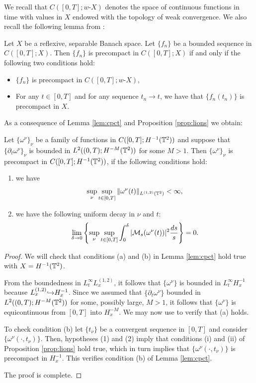 \documentclass[reqno,12pt]{amsart}
\begin{document}
We recall that $C([0,T];w\text{-}X)$ denotes the space of continuous functions in time with values in $X$ endowed with the topology of weak convergence. We also recall the following lemma from \cite{LNT}:

\begin{lemma}
\label{lem:cpct}
Let $X$ be a reflexive, separable Banach space. Let $\{f_n\}$ be a bounded sequence in $C([0,T];X)$. Then $\{f_n\}$ is precompact in $C([0,T];X)$ if and only if the following two conditions hold:
\begin{itemize}
\item[(a)] $\{f_n\}$ is precompact in $C([0,T];w\text{-}X)$,
\item[(b)] For any $t\in [0,T]$ and for any sequence $t_n \to t$, we have that $\{f_n(t_n)\}$ is precompact in $X$.
\end{itemize}
\end{lemma}




As a consequence of Lemma \ref{lem:cpct} and Proposition \ref{prop:lions} we obtain:
\begin{corollary}
\label{cor:cpct}
Let $\{\omega^\nu\}_\nu$ be a family of functions in $C([0,T];H^{-1}(\mathbb{T}^2))$ and suppose that $\{\partial_t \omega^\nu \}_\nu$ is bounded in  $L^2((0,T);H^{-M}(\mathbb{T}^2))$ for some $M>1$. Then $\{\omega^\nu\}_\nu$ is precompact in $C([0,T];H^{-1}(\mathbb{T}^2))$, if the following conditions hold:
\begin{enumerate}
\item we have
\[\sup_{\nu} \sup_{t\in [0,T]} \Vert \omega^\nu(t) \Vert_{L^{(1,2)}(\mathbb{T}^2)} < \infty,\]
\item we have the following uniform decay in $\nu$ and $t$:
  \[
  \lim_{\delta \to 0} \left\{ \sup_{\nu} \sup_{t\in [0,T]} \int_0^\delta |\mathcal{M}_s(\omega^\nu(t))|^2 \frac{ds}{s} \right\} = 0.
  \]
\end{enumerate}
\end{corollary}

\begin{proof}
We will check that conditions (a) and (b) in Lemma \ref{lem:cpct} hold true with $X=H^{-1}(\mathbb{T}^2)$.

From the boundedness in $L^\infty_t L^{(1,2)}_x$, it follows that $\{\omega^\nu\}$ is bounded in $L^\infty_tH^{-1}_x$ because $L^{(1,2)}_x {\hookrightarrow} H^{-1}_x$. Since we assumed that $\{\partial_t\omega^\nu\}$ bounded in $L^2((0,T);H^{-M}(\mathbb{T}^2))$ for some, possibly large, $M>1$, it follows that $\{\omega^\nu\}$ is equicontinuous from $[0,T]$ into $H^{-M}_x$. We may now use \cite[Lemma C.1]{Lions} to verify that (a) holds.

To check condition (b) let $\{t_\nu\}$ be a convergent sequence in $[0,T]$ and consider $\{\omega^\nu (\cdot,t_\nu)\}$. Then, hypotheses (1) and (2) imply that conditions (i) and (ii) of Proposition \ref{prop:lions} hold true, which in turn implies that $\{\omega^\nu(\cdot,t_\nu)\}$ is precompact in $H^{-1}_x$. This verifies condition (b) of Lemma \ref{lem:cpct}.

The proof is complete.
 \end{proof}
\end{document}
